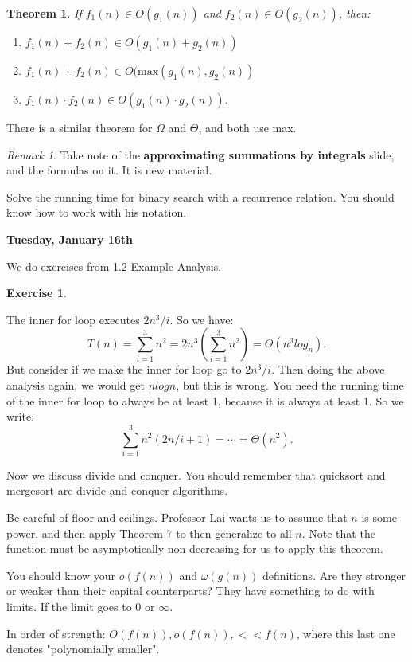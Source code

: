 \documentclass[reqno]{amsbook}
\theoremstyle{plain}
\newtheorem{Thm}{Theorem}
\numberwithin{section}{chapter}
\numberwithin{equation}{chapter}
\theoremstyle{definition}
\newtheorem{e}{Exercise}
\theoremstyle{remark}
\newtheorem{rem}[theorem]{Remark}
\begin{document}
\begin{Thm}
If $f_1(n) \in O(g_1(n))$ and $f_2(n) \in O(g_2(n))$, then: 
\begin{enumerate}
\item $f_1(n) + f_2(n) \in O(g_1(n) + g_2(n))$
\item $f_1(n) + f_2(n) \in O(\text{max}(g_1(n),g_2(n))$
\item $f_1(n) \cdot f_2(n) \in O(g_1(n) \cdot g_2(n))$.
\end{enumerate}
\end{Thm}

There is a similar theorem for $\Omega$ and $\Theta$, and both use max. 

\begin{rem}
Take note of the \textbf{approximating summations by integrals} slide, and the formulas on it. It is new material. 
\end{rem}

Solve the running time for binary search with a recurrence relation. You should know how to work with his notation. 

\textbf{Tuesday, January 16th}

We do exercises from 1.2 Example Analysis. 
\setcounter{e}{4}
\begin{e}
\end{e}
The inner for loop executes $2n^3/i$. So we have: 
$$
T(n) = \sum_{i = 1}^3n^2 = 2n^3\left(\sum_{i = 1}^3n^2\right) = \Theta(n^3log_n). 
$$
But consider if we make the inner for loop go to $2n^3/i$. Then doing the above analysis again, we would get $nlogn$, but this is wrong. You need the running time of the inner for loop to always be at least 1, because it is always at least 1. So we write: 
$$
\sum_{i = 1}^3n^2 \left( 2n/i + 1\right) = \cdots = \Theta(n^2).
$$

Now we discuss divide and conquer. You should remember that quicksort and mergesort are divide and conquer algorithms. 

Be careful of floor and ceilings. Professor Lai wants us to assume that $n$ is some power, and then apply Theorem 7 to then generalize to all $n$. Note that the function must be asymptotically non-decreasing for us to apply this theorem. 

You should know your $o(f(n))$ and $\omega(g(n))$ definitions. Are they stronger or weaker than their capital counterparts? They have something to do with limits. If the limit goes to 0 or $\infty$. 

In order of strength: 
$O(f(n)), o(f(n)), <<f(n)$, where this last one denotes "polynomially smaller". 
\end{document}
